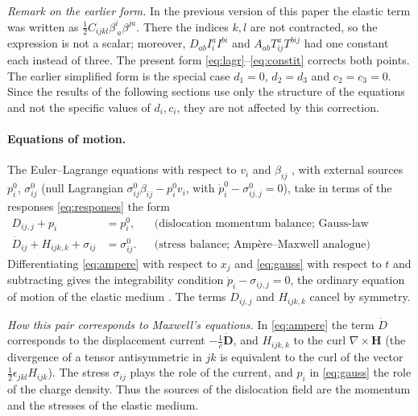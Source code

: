 \documentclass[12pt,a4paper]{article}
\begin{document}
\textit{Remark on the earlier form.} In the previous version of this paper the elastic
term was written as $\tfrac12C_{ijkl}\beta^i_{\ a}\beta^{ja}$. There the indices $k,l$
are not contracted, so the expression is not a scalar; moreover,
$D_{ab}I^a_iI^{bi}$ and $A_{ab}T^a_{ij}T^{bij}$ had one constant each instead of three.
The present form \eqref{eq:lagr}--\eqref{eq:constit} corrects both points. The earlier
simplified form is the special case $d_1=0$, $d_2=d_3$ and $c_2=c_3=0$. Since the
results of the following sections use only the structure of the equations and not
the specific values of $d_i,c_i$, they are not affected by this correction.

\paragraph{Equations of motion.} The Euler--Lagrange equations with respect to $v_i$
and $\beta_{ij}$ \cite[eqs.~(5)--(6)]{lazar2010pla}, with external sources $p^0_i$,
$\sigma^0_{ij}$ (null Lagrangian $\sigma^0_{ij}\beta_{ij}-p^0_iv_i$, with
$\dot p^0_i-\sigma^0_{ij,j}=0$), take in terms of the responses \eqref{eq:responses}
the form \cite[eqs.~(7)--(8)]{lazar2010pla}
\begin{align}
D_{ij,j}+p_i&=p^0_i, &&\text{(dislocation momentum balance; Gauss-law analogue)}\label{eq:gauss}\\
\dot D_{ij}+H_{ijk,k}+\sigma_{ij}&=\sigma^0_{ij}. &&\text{(stress balance; Amp\`ere--Maxwell analogue)}\label{eq:ampere}
\end{align}
Differentiating \eqref{eq:ampere} with respect to $x_j$ and \eqref{eq:gauss} with
respect to $t$ and subtracting gives the integrability condition
$\dot p_i-\sigma_{ij,j}=0$, the ordinary equation of motion of the elastic medium
\cite[eq.~(9)]{lazar2010pla}. The terms $D_{ij,j}$ and $H_{ijk,k}$ cancel by symmetry.

\textit{How this pair corresponds to Maxwell's equations.} In \eqref{eq:ampere} the term
$\dot D$ corresponds to the displacement current $-\frac1c\dot{\mathbf D}$, and
$H_{ijk,k}$ to the curl $\nabla\times\mathbf H$ (the divergence of a tensor
antisymmetric in $jk$ is equivalent to the curl of the vector
$\tfrac12\epsilon_{jkl}H_{ijk}$). The stress $\sigma_{ij}$ plays the role of the
current, and $p_i$ in \eqref{eq:gauss} the role of the charge density. Thus the
sources of the dislocation field are the momentum and the stresses of the elastic
medium.
\end{document}
